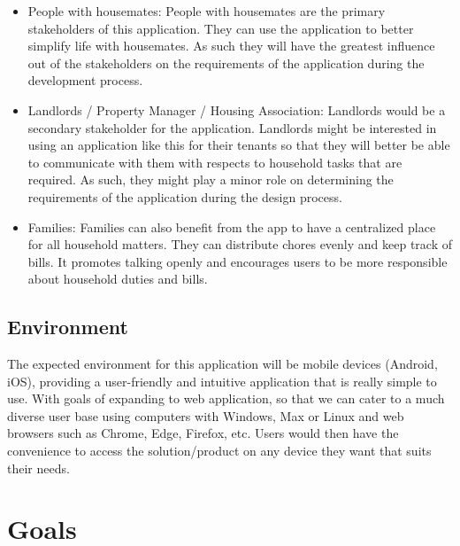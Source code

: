 \documentclass{article}
\begin{document}
\begin{itemize}
  \item People with housemates: People with housemates are the primary stakeholders of this application. They can use the application to better simplify life with housemates. As such they will have the greatest influence out of the stakeholders on the requirements of the application during the development process.
  \item Landlords / Property Manager / Housing Association: Landlords would be a secondary stakeholder for the application. Landlords might be interested in using an application like this for their tenants so that they will better be able to communicate with them with respects to household tasks that are required. As such, they might play a minor role on determining the requirements of the application during the design process.
  \item Families: Families can also benefit from the app to have a centralized place for all household matters. They can distribute chores evenly and keep track of bills. It promotes talking openly and encourages users to be more responsible about household duties and bills.
\end{itemize}

\subsection{Environment}

The expected environment for this application will be mobile devices (Android, iOS), providing a user-friendly and intuitive application that is really simple to use. With goals of expanding to web application, so that we can cater to a much diverse user base using computers with Windows, Max or Linux and web browsers such as Chrome, Edge, Firefox, etc. Users would then have the convenience to access the solution/product on any device they want that suits their needs. 

\section{Goals}
\end{document}
